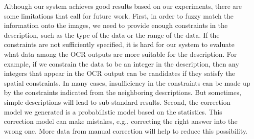 Although our system achieves good results based on our 
experiments, there are some limitations that call for future 
work. First, in order to fuzzy match the information onto the images, 
we need to provide enough constraints in the description, 
such as the type of the 
data or the range of the data. If the constraints are not 
sufficiently specified, it is hard for our system to evaluate what 
data among the OCR outputs are more suitable for the description. 
For example, if we constrain the data to be an integer in the 
description, then any integers that appear in the OCR output can be 
candidates if they satisfy the spatial constraints. 
In many cases, insufficiency in the constraints can be 
made up by the constraints indicated from the neighboring descriptions. 
But sometimes, simple descriptions will lead to sub-standard results. 
Second, the correction model 
we generated is a probabilistic model based on the statistics. 
This correction model can make mistakes, 
e.g., correcting the right answer into the wrong one. More data 
from manual correction will help to reduce this possibility. 

